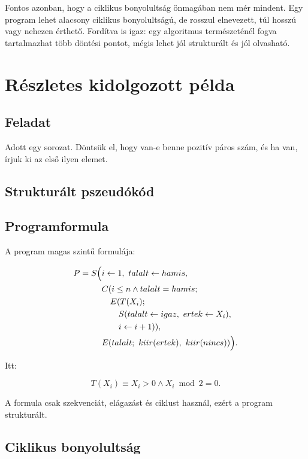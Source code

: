 Fontos azonban, hogy a ciklikus bonyolultság önmagában nem mér mindent. Egy program lehet alacsony ciklikus bonyolultságú, de rosszul elnevezett, túl hosszú vagy nehezen érthető. Fordítva is igaz: egy algoritmus természeténél fogva tartalmazhat több döntési pontot, mégis lehet jól strukturált és jól olvasható.

\section{Részletes kidolgozott példa}

\subsection{Feladat}

Adott egy sorozat. Döntsük el, hogy van-e benne pozitív páros szám, és ha van, írjuk ki az első ilyen elemet.

\subsection{Strukturált pszeudókód}


\subsection{Programformula}

A program magas szintű formulája:

\[
\begin{aligned}
P = S\Bigl(&i\leftarrow 1,\ talalt\leftarrow hamis,\\
& C(i\leq n\land talalt=hamis;\\
&\quad E(T(X_i);\\
&\qquad S(talalt\leftarrow igaz,\ ertek\leftarrow X_i),\\
&\qquad i\leftarrow i+1)),\\
& E(talalt;\ kiir(ertek),\ kiir(nincs))\Bigr).
\end{aligned}
\]

Itt:

\[
T(X_i) \equiv X_i>0\land X_i\bmod 2=0.
\]

A formula csak szekvenciát, elágazást és ciklust használ, ezért a program strukturált.

\subsection{Ciklikus bonyolultság}

